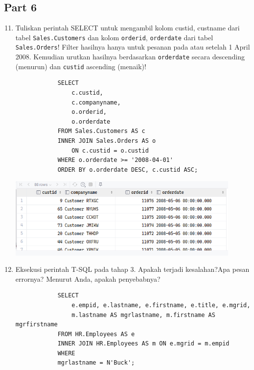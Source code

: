 \documentclass[12pt,titlepage]{article}
\begin{document}
\subsection{Part 6}
\begin{enumerate}
    \setcounter{enumi}{10}
    \item {
        Tuliskan perintah SELECT untuk mengambil kolom custid, custname dari tabel
        \texttt{Sales.Customers} dan kolom \texttt{orderid}, \texttt{orderdate} dari tabel \texttt{Sales.Orders}!
        Filter hasilnya hanya untuk pesanan pada atau setelah 1 April 2008.
        Kemudian urutkan hasilnya berdasarkan \texttt{orderdate} secara descending (menurun)
        dan \texttt{custid} ascending (menaik)!

        \begin{verbatim}
            SELECT
                c.custid,
                c.companyname,
                o.orderid,
                o.orderdate
            FROM Sales.Customers AS c
            INNER JOIN Sales.Orders AS o
                ON c.custid = o.custid
            WHERE o.orderdate >= '2008-04-01'
            ORDER BY o.orderdate DESC, c.custid ASC;
        \end{verbatim}

        \begin{center}
            \includegraphics[height=4cm]{./images/p6-n1.png}
        \end{center}
    }
    \item {
        Eksekusi perintah T-SQL pada tahap 3. Apakah terjadi kesalahan?Apa pesan
        errornya? Menurut Anda, apakah penyebabnya?

        \begin{verbatim}
            SELECT
                e.empid, e.lastname, e.firstname, e.title, e.mgrid,
                m.lastname AS mgrlastname, m.firstname AS mgrfirstname
            FROM HR.Employees AS e
            INNER JOIN HR.Employees AS m ON e.mgrid = m.empid
            WHERE
            mgrlastname = N'Buck';
        \end{verbatim}

}
\end{enumerate}
\end{document}
